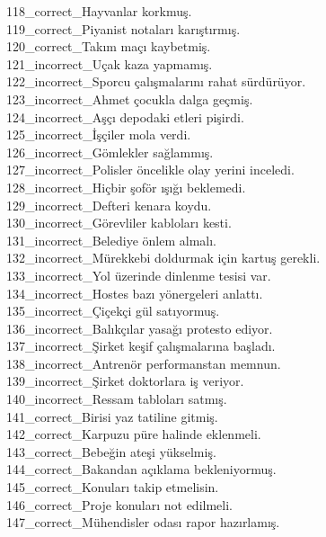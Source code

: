 \begin{myparindent}{0pt}
118\_correct\_Hayvanlar korkmuş. \\
119\_correct\_Piyanist notaları karıştırmış. \\
120\_correct\_Takım maçı kaybetmiş. \\
121\_incorrect\_Uçak kaza yapmamış. \\
122\_incorrect\_Sporcu çalışmalarını rahat sürdürüyor. \\
123\_incorrect\_Ahmet çocukla dalga geçmiş. \\
124\_incorrect\_Aşçı depodaki etleri pişirdi. \\
125\_incorrect\_İşçiler mola verdi. \\
126\_incorrect\_Gömlekler sağlammış. \\
127\_incorrect\_Polisler öncelikle olay yerini inceledi. \\
128\_incorrect\_Hiçbir şoför ışığı beklemedi. \\
129\_incorrect\_Defteri kenara koydu. \\
130\_incorrect\_Görevliler kabloları kesti. \\
131\_incorrect\_Belediye önlem almalı. \\
132\_incorrect\_Mürekkebi doldurmak için kartuş gerekli. \\
133\_incorrect\_Yol üzerinde dinlenme tesisi var. \\
134\_incorrect\_Hostes bazı yönergeleri anlattı. \\
135\_incorrect\_Çiçekçi gül satıyormuş. \\
136\_incorrect\_Balıkçılar yasağı protesto ediyor. \\
137\_incorrect\_Şirket keşif çalışmalarına başladı. \\
138\_incorrect\_Antrenör performanstan memnun. \\
139\_incorrect\_Şirket doktorlara iş veriyor. \\
140\_incorrect\_Ressam tabloları satmış. \\
141\_correct\_Birisi yaz tatiline gitmiş. \\
142\_correct\_Karpuzu püre halinde eklenmeli. \\
143\_correct\_Bebeğin ateşi yükselmiş. \\
144\_correct\_Bakandan açıklama bekleniyormuş. \\
145\_correct\_Konuları takip etmelisin. \\
146\_correct\_Proje konuları not edilmeli. \\
147\_correct\_Mühendisler odası rapor hazırlamış. \\

\end{myparindent}
